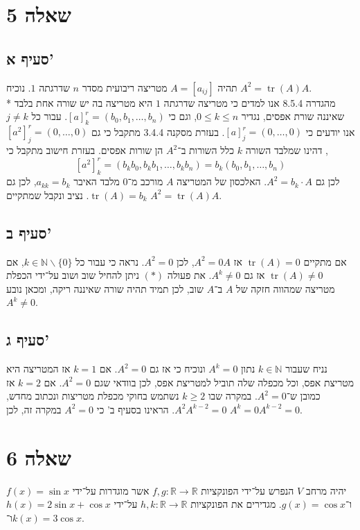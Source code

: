 \documentclass[a4paper]{article}
\DeclareMathOperator\tr{tr}
\def\NN{\mathbb{N}}
\def\RR{\mathbb{R}}
\begin{document}
\section{שאלה 5}
\subsection{סעיף א'}
תהיה $A = [a_{ij}]$ מטריצה ריבועית מסדר $n$ שדרגתה $1$. נוכיח $A^2 = \tr(A)A$. \\*
מהגדרה 8.5.4 אנו למדים כי מטריצה שדרגתה $1$ היא מטריצה בה יש
שורה אחת בלבד שאיננה שורת אפסים, נגדיר $0 \le k \le n$,
וגם כי ${[ a ]}^r_k = (b_0, b_1, \hdots, b_n)$.
עבור כל $j \ne k$ אנו יודעים כי ${[ a ]}^r_j = (0, \hdots, 0)$.
בעזרת מסקנה 3.4.4 מתקבל כי גם ${[ a^2 ]}^r_j = (0, \hdots, 0)$,
דהינו שמלבד השורה $k$ כלל השורות ב־$A^2$ הן שורות אפסים.
בעזרת חישוב מתקבל כי 
\[
	{[ a^2 ]}^r_k = (b_k b_0, b_k b_1, \hdots, b_k b_n)
	= b_k (b_0, b_1, \hdots, b_n) \tag{*}
\]
לכן גם $A^2 = b_k \cdot A$.
האלכסון של המטריצה $A$ מורכב מ־$0$ מלבד האיבר $a_{kk} = b_k$,
לכן גם $\tr(A) = b_k$.
נציב ונקבל שמתקיים $A^2 = \tr(A) A$.

\subsection{סעיף ב'}
אם מתקיים $\tr(A) = 0$ אז $A^2 = 0 A$, לכן $A^2 = 0$.
נראה כי עבור כל $k \in \mathbb{N} \backslash \{0\}$,
אם $\tr(A) \ne 0$ אז גם $A^k \ne 0$.
את פעולה $(*)$ ניתן להחיל שוב ושוב על־ידי הכפלת מטריצה שמהווה חזקה של $A$
ב־$A$ שוב, לכן תמיד תהיה שורה שאיננה ריקה, ומכאן נובע $A^k \ne 0$.

\subsection{סעיף ג'}
נניח שעבור $k \in \NN$ נתון $A^k = 0$ ונוכיח כי אז גם $A^2 = 0$.
אם $k = 1$ אז המטריצה היא מטריצת אפס, וכל מכפלה שלה תוביל למטריצת אפס,
לכן בוודאי שגם $A^2 = 0$.
אם $k = 2$ אז כמובן ש־$A^2 = 0$.
במקרה שבו $k \ge 2$ נשתמש בחוקי מכפלת מטריצות ונכתוב מחדש,
$A^2 A^{k - 2} = 0$.
הראינו בסעיף ב' כי $A^2 = 0$ במקרה זה, לכן $A^k = 0 A^{k - 2} = 0$.

\section{שאלה 6}
יהיה מרחב $V$ הנפרש על־ידי הפונקציות $f, g: \RR \to \RR$
אשר מוגדרות על־ידי $f(x) = \sin x$ ו־$g(x) = \cos x$.
מגדירים את הפונקציות $h, k: \RR \to \RR$ על־ידי
$h(x) = 2 \sin x + \cos x$ ו־$k(x) = 3 \cos x$.
\end{document}
